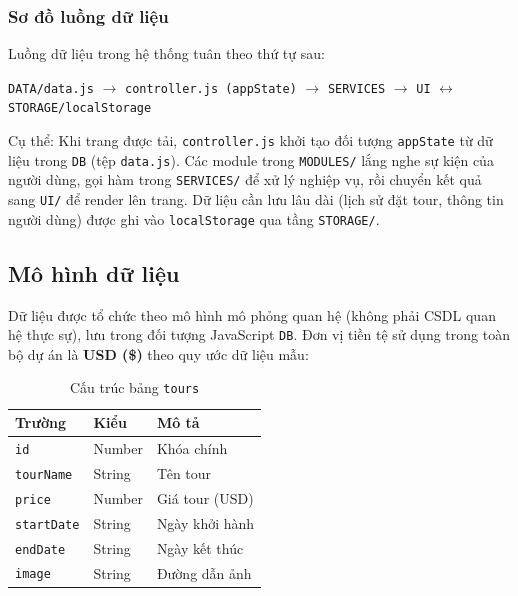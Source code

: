 \documentclass[12pt,a4paper]{article}
\begin{document}
\subsubsection{Sơ đồ luồng dữ liệu}

Luồng dữ liệu trong hệ thống tuân theo thứ tự sau:

\begin{center}
\texttt{DATA/data.js} $\rightarrow$ \texttt{controller.js (appState)} $\rightarrow$ \texttt{SERVICES} $\rightarrow$ \texttt{UI} $\leftrightarrow$ \texttt{STORAGE/localStorage}
\end{center}

Cụ thể: Khi trang được tải, \texttt{controller.js} khởi tạo đối tượng \texttt{appState} từ dữ liệu trong \texttt{DB} (tệp \texttt{data.js}). Các module trong \texttt{MODULES/} lắng nghe sự kiện của người dùng, gọi hàm trong \texttt{SERVICES/} để xử lý nghiệp vụ, rồi chuyển kết quả sang \texttt{UI/} để render lên trang. Dữ liệu cần lưu lâu dài (lịch sử đặt tour, thông tin người dùng) được ghi vào \texttt{localStorage} qua tầng \texttt{STORAGE/}.

\subsection{Mô hình dữ liệu}

Dữ liệu được tổ chức theo mô hình mô phỏng quan hệ (không phải CSDL quan hệ thực sự), lưu trong đối tượng JavaScript \texttt{DB}. Đơn vị tiền tệ sử dụng trong toàn bộ dự án là \textbf{USD (\$)} theo quy ước dữ liệu mẫu:

\begin{table}[H]
\centering
\caption{Cấu trúc bảng \texttt{tours}}
\begin{tabularx}{\textwidth}{|l|l|X|}
\hline
\textbf{Trường} & \textbf{Kiểu} & \textbf{Mô tả} \\
\hline
\texttt{id}        & Number & Khóa chính \\
\hline
\texttt{tourName}  & String & Tên tour \\
\hline
\texttt{price}     & Number & Giá tour (USD) \\
\hline
\texttt{startDate} & String & Ngày khởi hành \\
\hline
\texttt{endDate}   & String & Ngày kết thúc \\
\hline
\texttt{image}     & String & Đường dẫn ảnh \\
\hline
\end{tabularx}
\end{table}
\end{document}
